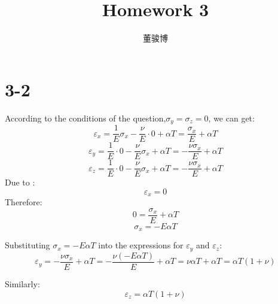 \documentclass[onecolumn,oneside]{SUSTechHomework}
\author{董骏博}
\title{Homework 3}
\begin{document}
  \maketitle

  \section*{3-2}
  According to the conditions of the question,\(\sigma_y = \sigma_z = 0\), we can get: 
  \[
  \varepsilon_x = \frac{1}{E} \sigma_x - \frac{\nu}{E} \cdot 0 + \alpha T = \frac{\sigma_x}{E} + \alpha T
  \]
  \[
  \varepsilon_y = \frac{1}{E} \cdot 0 - \frac{\nu}{E} \sigma_x + \alpha T = -\frac{\nu \sigma_x}{E} + \alpha T
  \]
  \[
  \varepsilon_z = \frac{1}{E} \cdot 0 - \frac{\nu}{E} \sigma_x + \alpha T = -\frac{\nu \sigma_x}{E} + \alpha T
  \]  
  Due to :
  \[
  \varepsilon_x = 0
  \]
  Therefore:
  \[
  0 = \frac{\sigma_x}{E} + \alpha T
  \]
  \[
  \sigma_x = -E \alpha T
  \]

  Substituting \(\sigma_x = -E \alpha T\) into the expressions for \(\varepsilon_y\) and \(\varepsilon_z\):
  \[
  \varepsilon_y = -\frac{\nu \sigma_x}{E} + \alpha T = -\frac{\nu (-E \alpha T)}{E} + \alpha T
  = \nu \alpha T + \alpha T
  = \alpha T (1 + \nu)
  \]
  
  Similarly:
  \[
  \varepsilon_z = \alpha T (1 + \nu)
  \]
  
\end{document}
